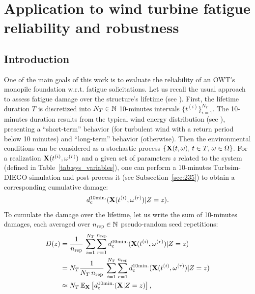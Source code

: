 \cleardoublepage
\chapter{Application to wind turbine fatigue reliability and robustness}
\label{chpt:7}
\hfill
\localtableofcontents
\newpage

\section{Introduction}
One of the main goals of this work is to evaluate the reliability of an OWT's monopile foundation w.r.t. fatigue solicitations. 
Let us recall the usual approach to assess fatigue damage over the structure's lifetime (see \citealp[Appendix H]{iec_2019}). 
First, the lifetime duration $T$ is discretized into $N_T \in \mathbb{N}$ 10-minutes intervals $\{t^{(i)}\}_{i=1}^{N_T}$. 
The 10-minutes duration results from the typical wind energy distribution (see ), presenting a ``short-term'' behavior (for turbulent wind with a return period below 10 minutes) and ``long-term'' behavior (otherwise).
Then the environmental conditions can be considered as a stochastic process $\{{\bf X}(t, \omega), \, t \in T, \, \omega \in \Omega\}$.%
For a realization ${\bf X}(t^{(i)}, \omega^{(r)})$ and a given set of parameters $z$ related to the system (defined in Table~\ref{tab:sys_variables}), one can perform a 10-minutes Turbsim-DIEGO simulation and post-process it (see Subsection~\ref{sec:235}) to obtain a corresponding cumulative damage:
\begin{equation}
    d_{\mathrm{c}}^{10\mathrm{min.}}({\bf X}(t^{(i)}, \omega^{(r)})|Z=z). 
\end{equation}
To cumulate the damage over the lifetime, let us write the sum of 10-minutes damages, each averaged over $n_{\mathrm{rep}} \in \mathbb{N}$ pseudo-random seed repetitions: 
\begin{subequations}
    \begin{align}
        D(z) &= \frac{1}{n_{\mathrm{rep}}} \, \sum_{i=1}^{N_T} \sum_{r=1}^{n_{\mathrm{rep}}} d_{\mathrm{c}}^{10\mathrm{min.}}({\bf X}(t^{(i)}, \omega^{(r)})|Z=z)\\
             &= N_T \frac{1}{N_T \, n_{\mathrm{rep}}} \, \sum_{i=1}^{N_T} \sum_{r=1}^{n_{\mathrm{rep}}} d_{\mathrm{c}}^{10\mathrm{min.}}({\bf X}(t^{(i)}, \omega^{(r)})|Z=z)\\
             &\approx N_T \, \mathbb{E}_{{\bf X}}\left[d_{\mathrm{c}}^{10\mathrm{min.}}({\bf X}|Z=z)\right],
             \label{eq:expected_damage}
    \end{align}
\end{subequations}
